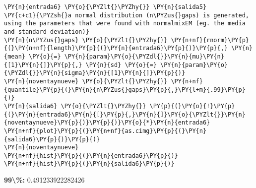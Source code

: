     \begin{tcolorbox}[breakable, size=fbox, boxrule=1pt, pad at break*=1mm,colback=cellbackground, colframe=cellborder]
\begin{Verbatim}[commandchars=\\\{\}]
\PY{n}{entrada6} \PY{o}{\PYZlt{}\PYZhy{}} \PY{n}{salida5}
\PY{c+c1}{\PYZsh{}a normal distribution (n\PYZus{}gaps) is generated, using the parameters that were found with normalmixEM (eg. the media and standard deviation)}
\PY{n}{n\PYZus{}gaps} \PY{o}{\PYZlt{}\PYZhy{}} \PY{n+nf}{rnorm}\PY{p}{(}\PY{n+nf}{length}\PY{p}{(}\PY{n}{entrada6}\PY{p}{)}\PY{p}{,} \PY{n}{mean} \PY{o}{=} \PY{n}{param}\PY{o}{\PYZdl{}}\PY{n}{mu}\PY{n}{[1}\PY{n}{]}\PY{p}{,} \PY{n}{sd} \PY{o}{=} \PY{n}{param}\PY{o}{\PYZdl{}}\PY{n}{sigma}\PY{n}{[1}\PY{n}{]}\PY{p}{)}
\PY{n}{noventaynueve} \PY{o}{\PYZlt{}\PYZhy{}} \PY{n+nf}{quantile}\PY{p}{(}\PY{n}{n\PYZus{}gaps}\PY{p}{,}\PY{l+m}{.99}\PY{p}{)}
\PY{n}{salida6} \PY{o}{\PYZlt{}\PYZhy{}} \PY{p}{(}\PY{o}{!}\PY{p}{(}\PY{n}{entrada6}\PY{n}{[}\PY{p}{,}\PY{n}{]}\PY{o}{\PYZlt{}}\PY{n}{noventaynueve}\PY{p}{)}\PY{p}{)}\PY{o}{*}\PY{n}{entrada6}
\PY{n+nf}{plot}\PY{p}{(}\PY{n+nf}{as.cimg}\PY{p}{(}\PY{n}{salida6}\PY{p}{)}\PY{p}{)}
\PY{n}{noventaynueve}
\PY{n+nf}{hist}\PY{p}{(}\PY{n}{entrada6}\PY{p}{)}
\PY{n+nf}{hist}\PY{p}{(}\PY{n}{salida6}\PY{p}{)}
\end{Verbatim}
\end{tcolorbox}

    \textbf{99\textbackslash{}\%:} 0.491233922282426

    
    \begin{center}
    \end{center}
    { \hspace*{\fill} \\}
    
    \begin{center}
    \end{center}
    { \hspace*{\fill} \\}
    
    \begin{center}
    \end{center}
    { \hspace*{\fill} \\}
    
